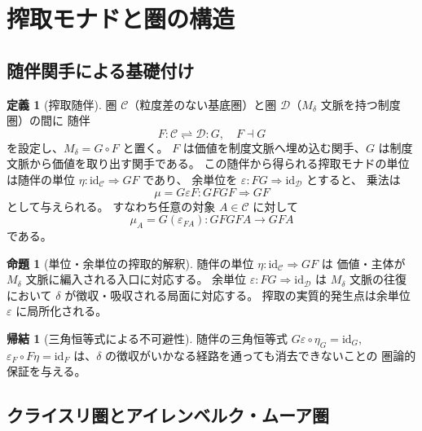 \documentclass[11pt,a4paper]{ltjsarticle}
\newcommand{\Mdelta}{M_\delta}
\newcommand{\id}{\mathrm{id}}
\theoremstyle{definition}
\newtheorem{definition}{定義}[section]
\newtheorem{proposition}{命題}[section]
\newtheorem{corollary}{帰結}[section]
\begin{document}
\section{搾取モナドと圏の構造}

\subsection{随伴関手による基礎付け}

\begin{definition}[搾取随伴]
圏 $\mathcal{C}$（粒度差のない基底圏）と圏 $\mathcal{D}$（$\Mdelta$ 文脈を持つ制度圏）の間に
随伴
\[
F : \mathcal{C} \rightleftharpoons \mathcal{D} : G, \quad F \dashv G
\]
を設定し、$\Mdelta = G \circ F$ と置く。
$F$ は価値を制度文脈へ埋め込む関手、$G$ は制度文脈から価値を取り出す関手である。
この随伴から得られる搾取モナドの単位は随伴の単位
$\eta: \id_{\mathcal{C}} \Rightarrow GF$ であり、
余単位を $\varepsilon: FG \Rightarrow \id_{\mathcal{D}}$ とすると、
乗法は
\begin{equation}
\mu = G\varepsilon F : GFGF \Rightarrow GF
\end{equation}
として与えられる。
すなわち任意の対象 $A \in \mathcal{C}$ に対して
\begin{equation}
\mu_A = G(\varepsilon_{F A}): G F G F A \to G F A
\end{equation}
である。
\end{definition}

\begin{proposition}[単位・余単位の搾取的解釈]
随伴の単位 $\eta: \mathrm{id}_{\mathcal{C}} \Rightarrow GF$ は
価値・主体が $\Mdelta$ 文脈に編入される入口に対応する。
余単位 $\varepsilon: FG \Rightarrow \mathrm{id}_{\mathcal{D}}$ は
$\Mdelta$ 文脈の往復において $\delta$ が徴収・吸収される局面に対応する。
搾取の実質的発生点は余単位 $\varepsilon$ に局所化される。
\end{proposition}

\begin{corollary}[三角恒等式による不可避性]
随伴の三角恒等式
$G\varepsilon \circ \eta_G = \mathrm{id}_G$,
$\varepsilon_F \circ F\eta = \mathrm{id}_F$
は、$\delta$ の徴収がいかなる経路を通っても消去できないことの
圏論的保証を与える。
\end{corollary}

\subsection{クライスリ圏とアイレンベルク・ムーア圏}
\end{document}
